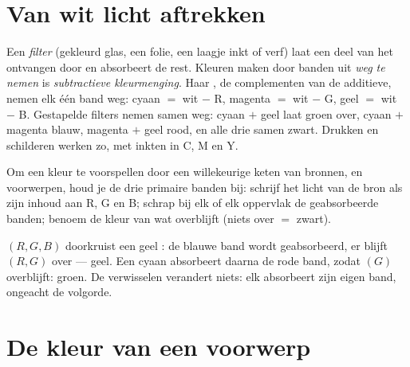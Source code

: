 \section{Van wit licht aftrekken}

\begin{definition}\label{def:g11:color-light-sources:subtractive}
Een \emph{filter} (gekleurd glas, een folie, een laagje
inkt of verf) laat een deel van het ontvangen  door en absorbeert
de rest. Kleuren maken door banden uit  \emph{weg te nemen} is
\emph{subtractieve kleurmenging}. Haar
, de complementen van de additieve, nemen elk één band
weg: cyaan $=$ wit $-$ R, magenta $=$ wit $-$ G, geel $=$ wit $-$ B.
Gestapelde filters nemen samen weg: cyaan $+$ geel laat groen over,
cyaan $+$ magenta blauw, magenta $+$ geel rood, en alle drie samen zwart.
Drukken en schilderen werken zo, met inkten in C, M en Y.
\end{definition}

\begin{method}\label{met:g11:color-light-sources:bookkeeping}
Om een kleur te voorspellen door een willekeurige keten van bronnen,
 en voorwerpen, houd je de drie primaire banden bij: schrijf het
licht van de bron als zijn inhoud aan R, G en B; schrap bij elk  of
elk oppervlak de geabsorbeerde banden; benoem de kleur van wat overblijft
(niets over $=$ zwart).
\end{method}

\begin{example}\label{ex:g11:color-light-sources:chain}
 $(R, G, B)$ doorkruist een geel : de blauwe band wordt
geabsorbeerd, er blijft $(R, G)$ over --- geel. Een cyaan 
absorbeert daarna de rode band, zodat $(G)$ overblijft: groen. De 
verwisselen verandert niets: elk absorbeert zijn eigen band, ongeacht de
volgorde.
\end{example}

\section{De kleur van een voorwerp}

